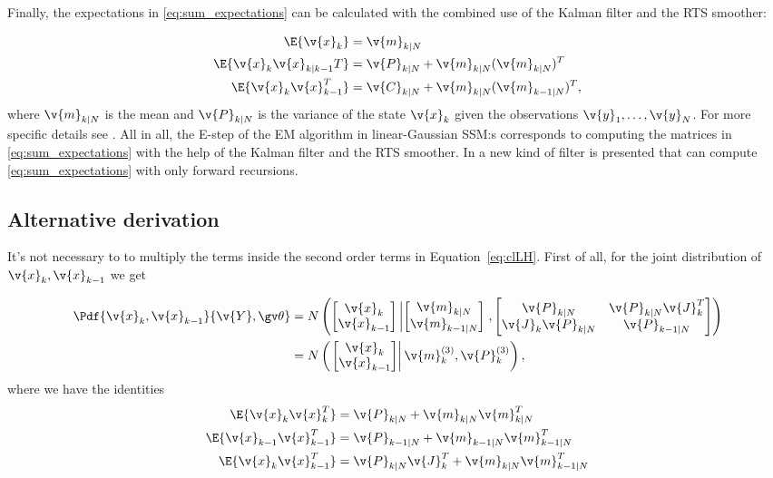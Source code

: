 Finally, the expectations in \eqref{eq:sum_expectations} can be
calculated with the combined use of the Kalman filter and the 
RTS smoother:

\begin{align}
	\E{\v{x}_k}&=\v{m}_{k|N}\\
	\E{\v{x}_k\v{x}_{k|k-1}T}&=\v{P}_{k|N}+\v{m}_{k|N}(\v{m}_{k|N})^T\\
	\E{\v{x}_k\v{x}_{k-1}^T}&=\v{C}_{k|N}+\v{m}_{k|N}(\v{m}_{k-1|N})^T,
\end{align}
where $\v{m}_{k|N}$ is the mean and $\v{P}_{k|N}$ is the variance of the state 
$\v{x}_k$ given the observations $\v{y}_1,\dots,\v{y}_N$.
For more specific details see \parencite{Gibson2005}. All in all, the E-step of the 
EM algorithm in linear-Gaussian SSM:s corresponds to computing
the matrices in \eqref{eq:sum_expectations} with the help of the Kalman filter and
the RTS smoother. In \parencite{Elliott1999} a new kind of filter is presented that
can compute \eqref{eq:sum_expectations} with only forward recursions. 

\subsection{Alternative derivation}

It's not necessary to to multiply the terms inside
the second order terms in Equation~\eqref{eq:clLH}. 
First of all, for the joint distribution of $\v{x}_k, \v{x}_{k-1}$
we get 

\begin{align}
\begin{split} 
	\Pdf{\v{x}_k, \v{x}_{k-1}}{\v{Y},\Th}&=
	N\left(
	\begin{bmatrix}
		\v{x}_k\\\v{x}_{k-1}
	\end{bmatrix}\left\vert
	\begin{bmatrix}
		\v{m}_{k|N}\\
		\v{m}_{k-1|N}
	\end{bmatrix}
	\right.,
	\begin{bmatrix}
		\v{P}_{k|N} & \v{P}_{k|N}\v{J}_k^T\\
		\v{J}_k\v{P}_{k|N} & \v{P}_{k-1|N}  
	\end{bmatrix}
	\right)\\
	&=N\left(
	\left.
	\begin{bmatrix}
		\v{x}_k\\\v{x}_{k-1}
	\end{bmatrix}\right\vert
		\v{m}_{k}^{(3)}
	,
		\v{P}_{k}^{(3)}
	\right),
\end{split}
\end{align}
where we have the identities
\begin{align}
	\E{\v{x}_k\v{x}_k^T}&=\v{P}_{k|N}+\v{m}_{k|N}\v{m}_{k|N}^T\\
	\E{\v{x}_{k-1}\v{x}_{k-1}^T}&=\v{P}_{k-1|N}+\v{m}_{k-1|N}\v{m}_{k-1|N}^T\\
	\E{\v{x}_{k}\v{x}_{k-1}^T}&=\v{P}_{k|N}\v{J}_k^T+\v{m}_{k|N}\v{m}_{k-1|N}^T
\end{align}

